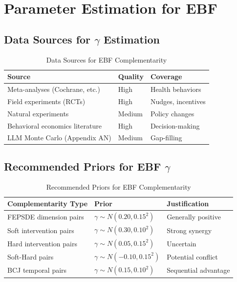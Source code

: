 \section{Parameter Estimation for EBF}
\label{sec:estimation}

\subsection{Data Sources for $\gamma$ Estimation}

\begin{table}[h]
\centering
\caption{Data Sources for EBF Complementarity}
\label{tab:data-sources}
\renewcommand{\arraystretch}{1.3}
\begin{tabular}{@{}lll@{}}
\toprule
\textbf{Source} & \textbf{Quality} & \textbf{Coverage} \\
\midrule
Meta-analyses (Cochrane, etc.) & High & Health behaviors \\
Field experiments (RCTs) & High & Nudges, incentives \\
Natural experiments & Medium & Policy changes \\
Behavioral economics literature & High & Decision-making \\
LLM Monte Carlo (Appendix AN) & Medium & Gap-filling \\
\bottomrule
\end{tabular}
\end{table}

\subsection{Recommended Priors for EBF $\gamma$}

\begin{table}[h]
\centering
\caption{Recommended Priors for EBF Complementarity}
\label{tab:ebf-priors}
\renewcommand{\arraystretch}{1.3}
\begin{tabular}{@{}lll@{}}
\toprule
\textbf{Complementarity Type} & \textbf{Prior} & \textbf{Justification} \\
\midrule
FEPSDE dimension pairs & $\gamma \sim N(0.20, 0.15^2)$ & Generally positive \\
Soft intervention pairs & $\gamma \sim N(0.30, 0.10^2)$ & Strong synergy \\
Hard intervention pairs & $\gamma \sim N(0.05, 0.15^2)$ & Uncertain \\
Soft-Hard pairs & $\gamma \sim N(-0.10, 0.15^2)$ & Potential conflict \\
BCJ temporal pairs & $\gamma \sim N(0.15, 0.10^2)$ & Sequential advantage \\
\bottomrule
\end{tabular}
\end{table}

